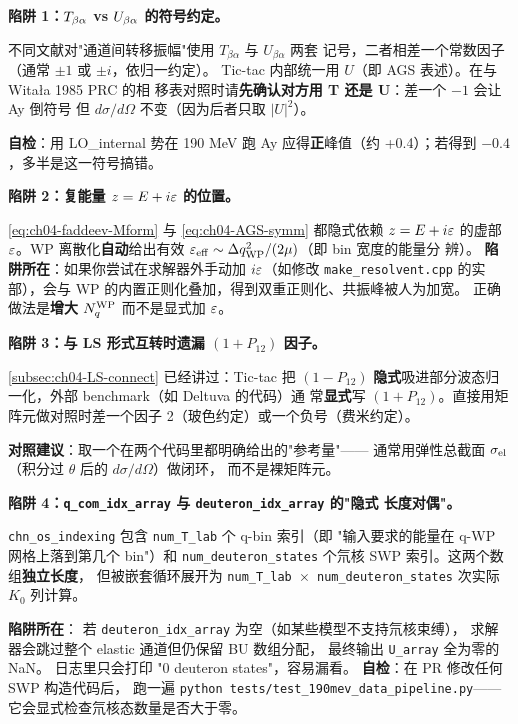 \begin{pitfallbox}
\textbf{陷阱 1：\(T_{\beta\alpha}\) vs \(U_{\beta\alpha}\) 的符号约定。}

不同文献对"通道间转移振幅"使用 \(T_{\beta\alpha}\) 与 \(U_{\beta\alpha}\) 两套
记号，二者相差一个常数因子（通常 \(\pm 1\) 或 \(\pm i\)，依归一约定）。
Tic-tac 内部统一用 \(U\)（即 AGS 表述）。在与 Witała 1985 PRC 的相
移表对照时请\textbf{先确认对方用 T 还是 U}：差一个 \(-1\) 会让 Ay 倒符号
但 \(d\sigma/d\Omega\) 不变（因为后者只取 \(|U|^2\)）。

\textbf{自检}：用 LO\_internal 势在 190 MeV 跑 Ay 应得\textbf{正}峰值（约
+0.4）；若得到 \(-0.4\)，多半是这一符号搞错。
\end{pitfallbox}

\begin{pitfallbox}
\textbf{陷阱 2：复能量 \(z = E + i\varepsilon\) 的位置。}

\cref{eq:ch04-faddeev-Mform} 与 \cref{eq:ch04-AGS-symm} 都隐式依赖
\(z = E + i\varepsilon\) 的虚部 \(\varepsilon\)。WP 离散化\textbf{自动}给出有效
\(\varepsilon_{\rm eff} \sim \Delta q_{\rm WP}^2 / (2 \mu)\)（即 bin 宽度的能量分
辨）。
\textbf{陷阱所在}：如果你尝试在求解器外手动加 \(i\varepsilon\)（如修改 \texttt{make\_resolvent.cpp}
的实部），会与 WP 的内置正则化叠加，得到双重正则化、共振峰被人为加宽。
正确做法是\textbf{增大 \(N_q^{\rm WP}\)} 而不是显式加 \(\varepsilon\)。
\end{pitfallbox}

\begin{pitfallbox}
\textbf{陷阱 3：与 LS 形式互转时遗漏 \((1 + P_{12})\) 因子。}

\cref{subsec:ch04-LS-connect} 已经讲过：Tic-tac 把 \((1 - P_{12})\)
\textbf{隐式}吸进部分波态归一化，外部 benchmark（如 Deltuva 的代码）通
常\textbf{显式}写 \((1 + P_{12})\)。直接用矩阵元做对照时差一个因子
2（玻色约定）或一个负号（费米约定）。

\textbf{对照建议}：取一个在两个代码里都明确给出的"参考量"——
通常用弹性总截面 \(\sigma_{\rm el}\)（积分过 \(\theta\) 后的 \(d\sigma/d\Omega\)）做闭环，
而不是裸矩阵元。
\end{pitfallbox}

\begin{pitfallbox}
\textbf{陷阱 4：\texttt{q\_com\_idx\_array} 与 \texttt{deuteron\_idx\_array} 的"隐式
长度对偶"。}

\texttt{chn\_os\_indexing} 包含 \texttt{num\_T\_lab} 个 q-bin 索引（即
"输入要求的能量在 q-WP 网格上落到第几个 bin"）和
\texttt{num\_deuteron\_states} 个氘核 SWP 索引。这两个数组\textbf{独立长度}，
但被嵌套循环展开为
\texttt{num\_T\_lab \(\times\) num\_deuteron\_states} 次实际 \(K_0\) 列计算。

\textbf{陷阱所在}：
若 \texttt{deuteron\_idx\_array} 为空（如某些模型不支持氘核束缚），
求解器会跳过整个 elastic 通道但仍保留 BU 数组分配，
最终输出 \texttt{U\_array} 全为零的 NaN。
日志里只会打印 "0 deuteron states"，容易漏看。
\textbf{自检}：在 PR 修改任何 SWP 构造代码后，
跑一遍 \texttt{python tests/test\_190mev\_data\_pipeline.py}——
它会显式检查氘核态数量是否大于零。
\end{pitfallbox}

